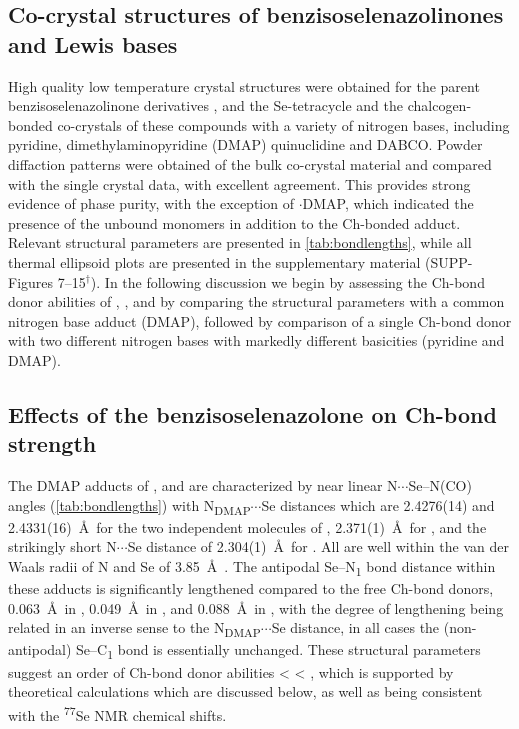 \begin{refsection}
\section{Co-crystal structures of benzisoselenazolinones and Lewis bases}
High quality low temperature crystal structures were obtained for the parent benzisoselenazolinone derivatives  \autocite{Thomas2015},  and the Se-tetracycle  and the chalcogen-bonded co-crystals of these compounds with a variety of nitrogen bases, including pyridine, dimethylaminopyridine (DMAP) quinuclidine and DABCO.
Powder diffaction patterns were obtained of the bulk co-crystal material and compared with the single crystal data, with excellent agreement.
This provides strong evidence of phase purity, with the exception of $\cdot$DMAP, which indicated the presence of the unbound monomers in addition to the Ch-bonded adduct.
Relevant structural parameters are presented in \ref{tab:bondlengths}, while all thermal ellipsoid plots are presented in the supplementary material (SUPP-Figures 7--15$^\dag$).
In the following discussion we begin by assessing the Ch-bond donor abilities of , , and  by comparing the structural parameters with a common nitrogen base adduct (DMAP), followed by comparison of a single Ch-bond donor  with two different nitrogen bases with markedly different basicities (pyridine and DMAP).

\subsection{Effects of the benzisoselenazolone on Ch-bond strength}
The DMAP adducts of ,  and  are characterized by near linear N$\cdots$Se--N(CO) angles (\ref{tab:bondlengths}) with N\textsubscript{DMAP}$\cdots$Se distances which are 2.4276(14) and 2.4331(16)~\AA \ for the two independent molecules of , 2.371(1)~\AA\ for , and the strikingly short N$\cdots$Se distance of 2.304(1)~\AA\ for .
All are well within the van der Waals radii of N and Se of 3.85~\AA\ \autocite{Batsanov2001}.
The antipodal Se--N\textsubscript{1} bond distance within these adducts is significantly lengthened compared to the free Ch-bond donors, 0.063~\AA\ in , 0.049~\AA\ in , and 0.088~\AA\ in , with the degree of lengthening being related in an inverse sense to the N\textsubscript{DMAP}$\cdots$Se distance, in all cases the (non-antipodal) Se--C\textsubscript{1} bond is essentially unchanged.
These structural parameters suggest an order of Ch-bond donor abilities  <  < , which is supported by theoretical calculations which are discussed below, as well as being consistent with the \textsuperscript{77}Se NMR chemical shifts.


\end{refsection}
